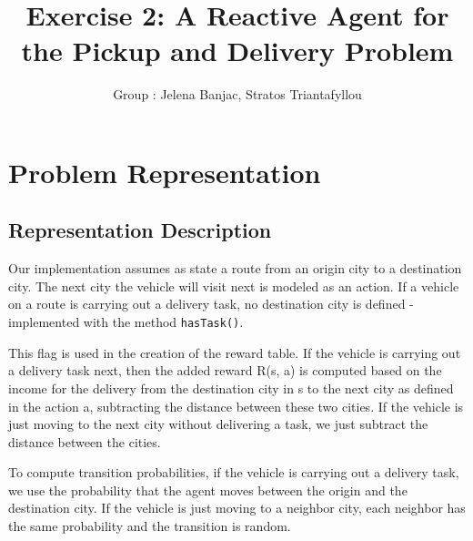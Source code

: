 \documentclass[11pt]{article}
\title{\bf Exercise 2: A Reactive Agent for the Pickup and Delivery Problem}
\author{Group \textnumero 70: Jelena Banjac, Stratos Triantafyllou}
\begin{document}
\maketitle


\section{Problem Representation}

\subsection{Representation Description}

Our implementation assumes as state a route from an origin city to a destination city. The next city the vehicle will visit next is modeled as an action. If a vehicle on a route is carrying out a delivery task, no destination city is defined - implemented with the method \texttt{hasTask()}.

This flag is used in the creation of the reward table. If the vehicle is carrying out a delivery task next, then the added reward R(s, a) is computed based on the income for the delivery from the destination city in s to the next city as defined in the action a, subtracting the distance between these two cities. If the vehicle is just moving to the next city without delivering a task, we just subtract the distance between the cities.

To compute transition probabilities, if the vehicle is carrying out a delivery task, we use the probability that the agent moves between the origin and the destination city. If the vehicle is just moving to a neighbor city, each neighbor has the same probability and the transition is random.
\end{document}
